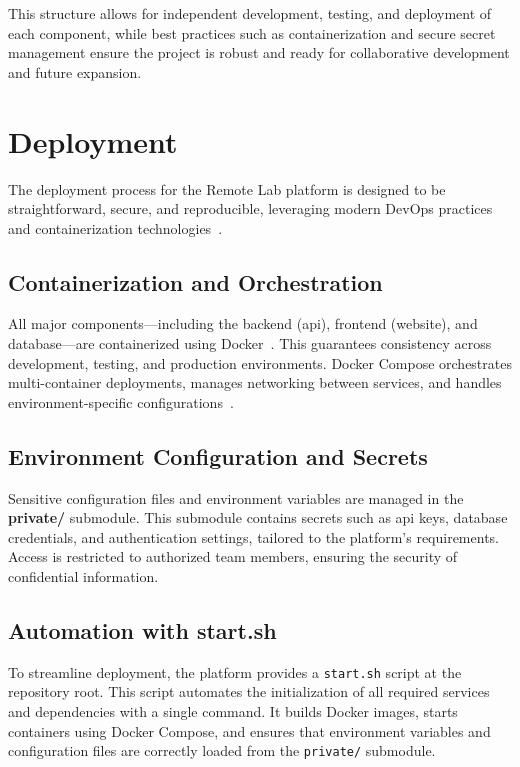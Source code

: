 This structure allows for independent development, testing, and deployment of each component, while best practices such as containerization and secure secret management ensure the project is robust and ready for collaborative development and future expansion.

\section{Deployment} \label{sec:deployment}

The deployment process for the Remote Lab platform is designed to be straightforward, secure, and reproducible, leveraging modern DevOps practices and containerization technologies~\cite{docker-docs,docker-compose-docs}.

\subsection{Containerization and Orchestration} \label{subsec:containerization}

All major components—including the backend (api), frontend (website), and database—are containerized using Docker~\cite{docker-docs}. This guarantees consistency across development, testing, and production environments. Docker Compose orchestrates multi-container deployments, manages networking between services, and handles environment-specific configurations~\cite{docker-compose-docs}.

\subsection{Environment Configuration and Secrets} \label{subsec:env_config}

Sensitive configuration files and environment variables are managed in the \textbf{private/} submodule. This submodule contains secrets such as \ac{api} keys, database credentials, and authentication settings, tailored to the platform's requirements. Access is restricted to authorized team members, ensuring the security of confidential information.

\subsection{Automation with start.sh} \label{subsec:automation_startsh}

To streamline deployment, the platform provides a \texttt{start.sh} script at the repository root. This script automates the initialization of all required services and dependencies with a single command. It builds Docker images, starts containers using Docker Compose, and ensures that environment variables and configuration files are correctly loaded from the \texttt{private/} submodule.

